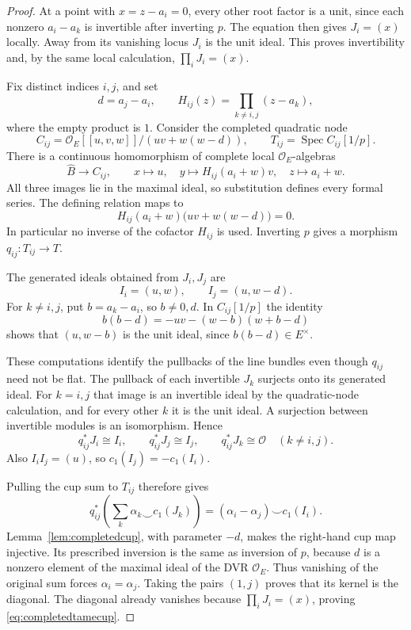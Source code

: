 \documentclass[11pt,a4paper]{article}
\theoremstyle{remark}
\newcommand{\OO}{\mathcal O}
\newcommand{\Spec}{\operatorname{Spec}}
\begin{document}
\begin{proof}
At a point with $x=z-a_i=0$, every other root factor is a unit, since each nonzero $a_i-a_k$ is invertible after inverting $p$. The equation then gives $J_i=(x)$ locally. Away from its vanishing locus $J_i$ is the unit ideal. This proves invertibility and, by the same local calculation, $\prod_iJ_i=(x)$.

Fix distinct indices $i,j$, and set
\[
d=a_j-a_i,\qquad H_{ij}(z)=\prod_{k\ne i,j}(z-a_k),
\]
where the empty product is $1$. Consider the completed quadratic node
\[
C_{ij}=\OO_E[[u,v,w]]/(uv+w(w-d)),\qquad
T_{ij}=\Spec C_{ij}[1/p].
\]
There is a continuous homomorphism of complete local $\OO_E$-algebras
\begin{equation}\label{eq:pairwiseformalmap}
\widehat B\longrightarrow C_{ij},\qquad
x\longmapsto u,\quad
y\longmapsto H_{ij}(a_i+w)v,\quad
z\longmapsto a_i+w.
\end{equation}
All three images lie in the maximal ideal, so substitution defines every formal series. The defining relation maps to
\[
H_{ij}(a_i+w)\bigl(uv+w(w-d)\bigr)=0.
\]
In particular no inverse of the cofactor $H_{ij}$ is used. Inverting $p$ gives a morphism $q_{ij}:T_{ij}\to T$.

The generated ideals obtained from $J_i,J_j$ are
\[
I_i=(u,w),\qquad I_j=(u,w-d).
\]
For $k\ne i,j$, put $b=a_k-a_i$, so $b\ne0,d$. In $C_{ij}[1/p]$ the identity
\[
b(b-d)=-uv-(w-b)(w+b-d)
\]
shows that $(u,w-b)$ is the unit ideal, since $b(b-d)\in E^\times$.

These computations identify the pullbacks of the line bundles even though $q_{ij}$ need not be flat. The pullback of each invertible $J_k$ surjects onto its generated ideal. For $k=i,j$ that image is an invertible ideal by the quadratic-node calculation, and for every other $k$ it is the unit ideal. A surjection between invertible modules is an isomorphism. Hence
\[
q_{ij}^*J_i\cong I_i,\qquad
q_{ij}^*J_j\cong I_j,\qquad
q_{ij}^*J_k\cong\OO\quad(k\ne i,j).
\]
Also $I_iI_j=(u)$, so $c_1(I_j)=-c_1(I_i)$.

Pulling the cup sum to $T_{ij}$ therefore gives
\[
q_{ij}^*\left(\sum_k\alpha_k\smile c_1(J_k)\right)
=(\alpha_i-\alpha_j)\smile c_1(I_i).
\]
Lemma~\ref{lem:completedcup}, with parameter $-d$, makes the right-hand cup map injective. Its prescribed inversion is the same as inversion of $p$, because $d$ is a nonzero element of the maximal ideal of the DVR $\OO_E$. Thus vanishing of the original sum forces $\alpha_i=\alpha_j$. Taking the pairs $(1,j)$ proves that its kernel is the diagonal. The diagonal already vanishes because $\prod_iJ_i=(x)$, proving \eqref{eq:completedtamecup}.
\end{proof}
\end{document}
